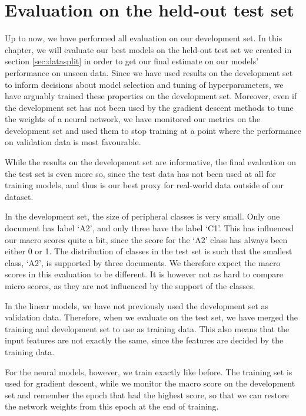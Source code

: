 \chapter{Evaluation on the held-out test set} \label{ch:heldout}

Up to now, we have performed all evaluation on our development set. In this
chapter, we will evaluate our best models on the held-out test set we created
in section \ref{sec:datasplit} in order to get our final estimate on our
models' performance on unseen data. Since we have used results on the
development set to inform decisions about model selection and tuning of
hyperparameters, we have arguably trained these properties on the development
set. Moreover, even if the development set has not been used by the gradient
descent methods to tune the weights of a neural network, we have monitored
our metrics on the development set and used them to stop training at a point
where the performance on validation data is most favourable.

While the results on the development set are informative, the final
evaluation on the test set is even more so, since the test data has not been
used at all for training models, and thus is our best proxy for real-world
data outside of our dataset.

In the development set, the size of peripheral classes is very small. Only
one document has label `A2', and only three have the label `C1'. This has
influenced our macro \FI scores quite a bit, since the \FI score for the `A2'
class has always been either 0 or 1. The distribution of classes in the test
set is such that the smallest class, `A2', is supported by three documents.
We therefore expect the macro \FI scores in this evaluation to be different.
It is however not as hard to compare micro \FI scores, as they are not
influenced by the support of the classes.

In the linear models, we have not previously used the development set as
validation data. Therefore, when we evaluate on the test set, we have merged
the training and development set to use as training data. This also means
that the input features are not exactly the same, since the features are
decided by the training data.

For the neural models, however, we train exactly like before. The training
set is used for gradient descent, while we monitor the macro \FI score on the
development set and remember the epoch that had the highest \FI score, so
that we can restore the network weights from this epoch at the end of
training.


